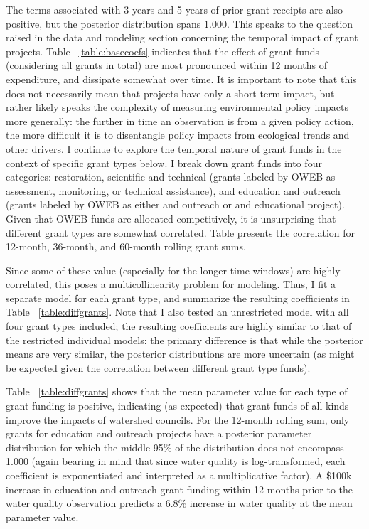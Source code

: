 \documentclass[11pt,a4paper,titlepage]{article}
\begin{document}
The terms associated with 3 years and 5 years of prior grant receipts are also positive, but the posterior distribution spans $1.000$. This speaks to the question raised in the data and modeling section concerning the temporal impact of grant projects. Table ~\ref{table:basecoefs} indicates that the effect of grant funds (considering all grants in total) are most pronounced within 12 months of expenditure, and dissipate somewhat over time. It is important to note that this does not necessarily mean that projects have only a short term impact, but rather likely speaks the complexity of measuring environmental policy impacts more generally: the further in time an observation is from a given policy action, the more difficult it is to disentangle policy impacts from ecological trends and other drivers. I continue to explore the temporal nature of grant funds in the context of specific grant types below. I break down grant funds into four categories: restoration, scientific and technical (grants labeled by OWEB as assessment, monitoring, or technical assistance), and education and outreach (grants labeled by OWEB as either and outreach or and educational project). Given that OWEB funds are allocated competitively, it is unsurprising that different grant types are somewhat correlated. Table presents the correlation for 12-month, 36-month, and 60-month rolling grant sums.



Since some of these value (especially for the longer time windows) are highly correlated, this poses a multicollinearity problem for modeling. Thus, I fit a separate model for each grant type, and summarize the resulting coefficients in Table ~\ref{table:diffgrants}. Note that I also tested an unrestricted model with all four grant types included; the resulting coefficients are highly similar to that of the restricted individual models: the primary difference is that while the posterior means are very similar, the posterior distributions are more uncertain (as might be expected given the correlation between different grant type funds). 



Table ~\ref{table:diffgrants} shows that the mean parameter value for each type of grant funding is positive, indicating (as expected) that grant funds of all kinds improve the impacts of watershed councils. For the 12-month rolling sum, only grants for education and outreach projects have a posterior parameter distribution for which the middle 95\% of the distribution does not encompass 1.000 (again bearing in mind that since water quality is log-transformed, each coefficient is exponentiated and interpreted as a multiplicative factor). A \$100k increase in education and outreach grant funding within 12 months prior to the water quality observation predicts a 6.8\% increase in water quality at the mean parameter value.
\end{document}
